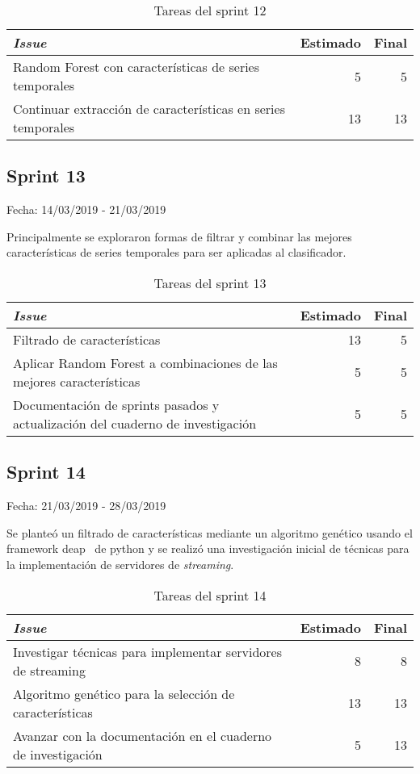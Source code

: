 \begin{table}[H]
	\begin{tabularx}{\textwidth}{Xrr}
		\toprule \textbf{\textit{Issue}} & \textbf{Estimado} & \textbf{Final}\\
		\toprule
		Random Forest con características de series temporales & 5 & 5 \\
		Continuar extracción de características en series temporales & 13 & 13 \\
		\bottomrule
	\end{tabularx}
	\caption{Tareas del sprint 12}
\end{table}

\subsection{Sprint 13}

Fecha: 14/03/2019 - 21/03/2019

Principalmente se exploraron formas de filtrar y combinar las mejores características de series temporales para ser aplicadas al clasificador. 

\begin{table}[H]
	\begin{tabularx}{\textwidth}{Xrr}
		\toprule \textbf{\textit{Issue}} & \textbf{Estimado} & \textbf{Final}\\
		\toprule 
		Filtrado de características & 13 & 5 \\
		Aplicar Random Forest a combinaciones de las mejores características & 5 & 5 \\
		Documentación de sprints pasados y actualización del cuaderno de investigación & 5 & 5 \\
		\bottomrule
	\end{tabularx}
	\caption{Tareas del sprint 13}
\end{table}

\subsection{Sprint 14}

Fecha: 21/03/2019 - 28/03/2019

Se planteó un filtrado de características mediante un algoritmo genético usando el framework deap~\cite{deap} de python y se realizó una investigación inicial de técnicas para la implementación de servidores de \textit{streaming}. 

\begin{table}[H]
	\begin{tabularx}{\textwidth}{Xrr}
		\toprule \textbf{\textit{Issue}} & \textbf{Estimado} & \textbf{Final}\\
		\toprule 
		Investigar técnicas para implementar servidores de streaming & 8 & 8 \\
		Algoritmo genético para la selección de características & 13 & 13 \\
		Avanzar con la documentación en el cuaderno de investigación & 5 & 13 \\
		\bottomrule
	\end{tabularx}
	\caption{Tareas del sprint 14}
\end{table}

